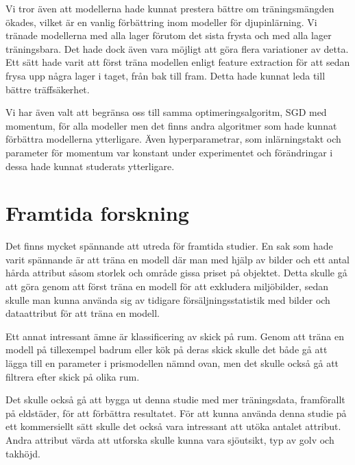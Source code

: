\documentclass[]{kththesis}
\begin{document}
Vi tror även att modellerna hade kunnat prestera bättre om träningsmängden ökades, vilket är en vanlig förbättring inom modeller för djupinlärning. Vi tränade modellerna med alla lager förutom det sista frysta och med alla lager träningsbara. Det hade dock även vara möjligt att göra flera variationer av detta. Ett sätt hade varit att först träna modellen enligt feature extraction för att sedan frysa upp några lager i taget, från bak till fram. Detta hade kunnat leda till bättre träffsäkerhet. 

Vi har även valt att begränsa oss till samma optimeringsalgoritm, SGD med momentum, för alla modeller men det finns andra algoritmer som hade kunnat förbättra modellerna ytterligare. Även hyperparametrar, som inlärningstakt och parameter för momentum var konstant under experimentet och förändringar i dessa hade kunnat studerats ytterligare.


\section{Framtida forskning}

Det finns mycket spännande att utreda för framtida studier.
En sak som hade varit spännande är att träna en modell där man med hjälp av bilder och ett antal hårda attribut såsom storlek och område gissa priset på objektet.
Detta skulle gå att göra genom att först träna en modell för att exkludera miljöbilder, sedan skulle man kunna använda sig av tidigare försäljningsstatistik med bilder och dataattribut för att träna en modell.

Ett annat intressant ämne är klassificering av skick på rum. 
Genom att träna en modell på tillexempel badrum eller kök på deras skick skulle det både gå att lägga till en parameter i prismodellen nämnd ovan, men det skulle också gå att filtrera efter skick på olika rum.

Det skulle också gå att bygga ut denna studie med mer träningsdata, framförallt på eldstäder, för att förbättra resultatet.
För att kunna använda denna studie på ett kommersiellt sätt skulle det också vara intressant att utöka antalet attribut. 
Andra attribut värda att utforska skulle kunna vara sjöutsikt, typ av golv och takhöjd.
\end{document}
